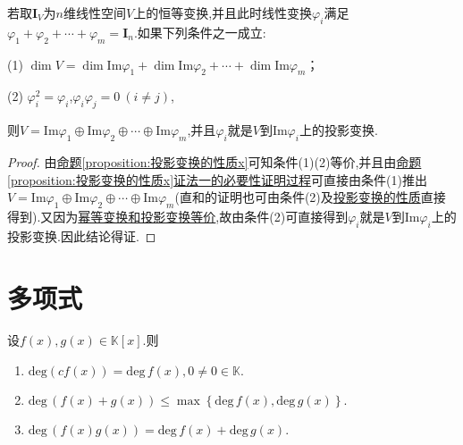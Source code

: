 \documentclass[lang=cn,newtx,10pt,scheme=chinese]{elegantbook}
\begin{document}
\begin{corollary}\label{corollary:恒等变换的幂等分解}
若取\(\boldsymbol{I}_V\)为$n$维线性空间\(V\)上的恒等变换,并且此时线性变换\(\varphi_i\)满足\(\varphi_1+\varphi_2+\cdots+\varphi_m = \boldsymbol{I}_n\).如果下列条件之一成立:

(1) \(\dim V=\dim\text{Im}\varphi_1+\dim\text{Im}\varphi_2+\cdots+\dim\text{Im}\varphi_m\)；

(2) \(\varphi_i^2 = \varphi_i\),\(\varphi_i\varphi_j = 0\ (i\neq j)\),

则\(V = \text{Im}\varphi_1\oplus\text{Im}\varphi_2\oplus\cdots\oplus\text{Im}\varphi_m\),并且\(\varphi_i\)就是\(V\)到\(\text{Im}\varphi_i\)上的投影变换.
\end{corollary}
\begin{proof}
由\hyperref[proposition:投影变换的性质x]{命题\ref{proposition:投影变换的性质x}}可知条件(1)(2)等价,并且由\hyperref[proposition:投影变换的性质x]{命题\ref{proposition:投影变换的性质x}证法一的必要性证明过程}可直接由条件(1)推出\(V = \text{Im}\varphi_1\oplus\text{Im}\varphi_2\oplus\cdots\oplus\text{Im}\varphi_m\)(直和的证明也可由条件(2)及\hyperref[proposition:投影变换的性质]{投影变换的性质}直接得到).又因为\hyperlink{幂等变换和投影变换等价}{幂等变换和投影变换等价},故由条件(2)可直接得到\(\varphi_i\)就是\(V\)到\(\text{Im}\varphi_i\)上的投影变换.因此结论得证.
\end{proof}






\chapter{多项式}

\begin{proposition}[多项式次数的性质]\label{proposition:多项式次数的性质}
设$f(x),g(x)\in \mathbb{K}[x]$.则
\begin{enumerate}
\item $\mathrm{deg}\left( cf\left( x \right) \right) =\mathrm{deg}\,f\left( x \right) ,0\ne 0\in \mathbb{K} .$

\item $\mathrm{deg}\,\left( f\left( x \right) +g\left( x \right) \right) \leqslant\max \left\{ \mathrm{deg}\,f\left( x \right) ,\mathrm{deg}\,g\left( x \right) \right\} .$

\item $\mathrm{deg}\,\left( f\left( x \right) g\left( x \right) \right) =\mathrm{deg}\,f\left( x \right) +\mathrm{deg}\,g\left( x \right).$
\end{enumerate}
\end{proposition}
\end{document}
